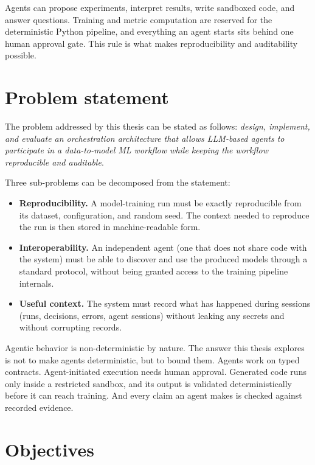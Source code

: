 Agents can propose experiments, interpret results, write sandboxed code, and answer questions. Training and metric computation are reserved for the deterministic Python pipeline, and everything an agent starts sits behind one human approval gate. This rule is what makes reproducibility and auditability possible.

\section{Problem statement}
\label{sec:problem}

The problem addressed by this thesis can be stated as follows: \emph{design, implement, and evaluate an orchestration architecture that allows LLM-based agents to participate in a data-to-model ML workflow while keeping the workflow reproducible and auditable}.

Three sub-problems can be decomposed from the statement:

\begin{itemize}
	\item \textbf{Reproducibility.} A model-training run must be exactly reproducible from its dataset, configuration, and random seed. The context needed to reproduce the run is then stored in machine-readable form.
	\item \textbf{Interoperability.} An independent agent (one that does not share code with the system) must be able to discover and use the produced models through a standard protocol, without being granted access to the training pipeline internals.
	\item \textbf{Useful context.} The system must record what has happened during sessions (runs, decisions, errors, agent sessions) without leaking any secrets and without corrupting records.
\end{itemize}

Agentic behavior is non-deterministic by nature. The answer this thesis explores is not to make agents deterministic, but to bound them. Agents work on typed contracts. Agent-initiated execution needs human approval. Generated code runs only inside a restricted sandbox, and its output is validated deterministically before it can reach training. And every claim an agent makes is checked against recorded evidence.

\section{Objectives}
\label{sec:objectives}

